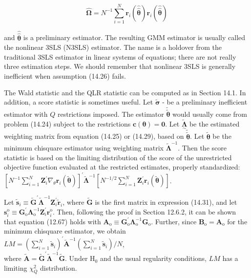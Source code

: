 \documentclass[10pt]{article}
\begin{document}
\begin{equation*}
\hat{\boldsymbol{\Omega}}=N^{-1} \sum_{i=1}^{N} \mathbf{r}_{i}(\hat{\hat{\boldsymbol{\theta}}}) \mathbf{r}_{i}(\hat{\hat{\boldsymbol{\theta}}}) \tag{14.30}
\end{equation*}


and $\hat{\hat{\boldsymbol{\theta}}}$ is a preliminary estimator. The resulting GMM estimator is usually called the nonlinear 3SLS (N3SLS) estimator. The name is a holdover from the traditional 3SLS estimator in linear systems of equations; there are not really three estimation steps. We should remember that nonlinear 3SLS is generally inefficient when assumption (14.26) fails.

The Wald statistic and the QLR statistic can be computed as in Section 14.1. In addition, a score statistic is sometimes useful. Let $\boldsymbol{\tilde { \boldsymbol { \sigma } }}$ - be a preliminary inefficient estimator with $Q$ restrictions imposed. The estimator $\tilde{\tilde{\boldsymbol{\theta}}}$ would usually come from problem (14.24) subject to the restrictions $\mathbf{c}(\boldsymbol{\theta})=\mathbf{0}$. Let $\underset{\sim}{\tilde{\boldsymbol{\Lambda}}}$ be the estimated weighting matrix from equation (14.25) or (14.29), based on $\tilde{\tilde{\boldsymbol{\theta}}}$. Let $\tilde{\boldsymbol{\theta}}$ be the minimum chisquare estimator using weighting matrix $\tilde{\boldsymbol{\Lambda}}^{-1}$. Then the score statistic is based on the limiting distribution of the score of the unrestricted objective function evaluated at the restricted estimates, properly standardized:\\
$\left[N^{-1} \sum_{i=1}^{N} \mathbf{Z}_{i}^{\prime} \nabla_{\theta} \mathbf{r}_{i}(\tilde{\boldsymbol{\theta}})\right]^{\prime} \tilde{\boldsymbol{\Lambda}}^{-1}\left[N^{-1 / 2} \sum_{i=1}^{N} \mathbf{Z}_{i}^{\prime} \mathbf{r}_{i}(\tilde{\boldsymbol{\theta}})\right]$.

Let $\tilde{\mathbf{s}}_{i} \equiv \tilde{\mathbf{G}}^{\prime} \tilde{\boldsymbol{\Lambda}}^{-1} \mathbf{Z}_{i}^{\prime} \tilde{\mathbf{r}}_{i}$, where $\tilde{\mathbf{G}}$ is the first matrix in expression (14.31), and let $\mathbf{s}_{i}^{\mathrm{o}} \equiv \mathbf{G}_{\mathrm{o}}^{\prime} \boldsymbol{\Lambda}_{\mathrm{o}}^{-1} \mathbf{Z}_{i}^{\prime} \mathbf{r}_{i}^{\mathrm{o}}$. Then, following the proof in Section 12.6.2, it can be shown that equation (12.67) holds with $\mathbf{A}_{\mathrm{o}} \equiv \mathbf{G}_{\mathrm{o}}^{\prime} \boldsymbol{\Lambda}_{\mathrm{o}}^{-1} \mathbf{G}_{\mathrm{o}}$. Further, since $\mathbf{B}_{\mathrm{o}}=\mathbf{A}_{\mathrm{o}}$ for the minimum chisquare estimator, we obtain\\
$L M=\left(\sum_{i=1}^{N} \tilde{\mathbf{s}}_{i}\right)^{\prime} \tilde{\mathbf{A}}^{-1}\left(\sum_{i=1}^{N} \tilde{\mathbf{s}}_{i}\right) / N$,\\
where $\tilde{\mathbf{A}}=\tilde{\mathbf{G}}^{\prime} \tilde{\boldsymbol{\Lambda}}^{-1} \tilde{\mathbf{G}}$. Under $\mathrm{H}_{0}$ and the usual regularity conditions, $L M$ has a limiting $\chi_{Q}^{2}$ distribution.
\end{document}
